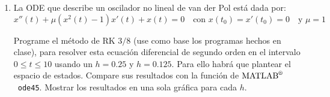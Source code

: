 \documentclass[letterpaper,12pt]{exam}
\newcommand{\matlab}{$\text{MATLAB}^{\text{\textregistered}}$~}
\begin{document}
\begin{enumerate}
\item La ODE que describe un oscilador no lineal de van der Pol está dada por:
 \begin{equation}
  x''(t) + \mu (x^2(t) - 1) x'(t) + x(t) = 0 \quad \text{con } x(t_0) = x'(t_0) = 0 \quad \text{y } \mu=1
 \end{equation}

 Programe el método de RK $3/8$ (use como base los programas hechos en clase), para resolver esta ecuación diferencial de segundo orden en el intervalo $0\leq t \leq 10$ usando un $h=0.25$ y $h=0.125$. Para ello habrá que plantear el espacio de estados. Compare sus resultados con la función de \matlab \texttt{ode45}. Mostrar los resultados en una sola gráfica para cada $h$. 
 
\end{enumerate}
\end{document}
